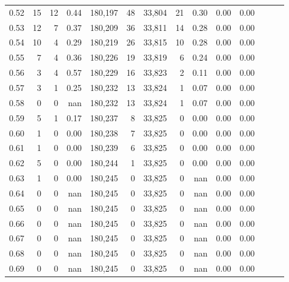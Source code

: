 \begin{tabular}{rrrrrrrrrrrrrr}
0.52 &      15 &     12 &  0.44 &  180,197 &       48 &  33,804 &      21 &  0.30 &  0.00 &      0.00 \\
0.53 &      12 &      7 &  0.37 &  180,209 &       36 &  33,811 &      14 &  0.28 &  0.00 &      0.00 \\
0.54 &      10 &      4 &  0.29 &  180,219 &       26 &  33,815 &      10 &  0.28 &  0.00 &      0.00 \\
0.55 &       7 &      4 &  0.36 &  180,226 &       19 &  33,819 &       6 &  0.24 &  0.00 &      0.00 \\
0.56 &       3 &      4 &  0.57 &  180,229 &       16 &  33,823 &       2 &  0.11 &  0.00 &      0.00 \\
0.57 &       3 &      1 &  0.25 &  180,232 &       13 &  33,824 &       1 &  0.07 &  0.00 &      0.00 \\
0.58 &       0 &      0 &   nan &  180,232 &       13 &  33,824 &       1 &  0.07 &  0.00 &      0.00 \\
0.59 &       5 &      1 &  0.17 &  180,237 &        8 &  33,825 &       0 &  0.00 &  0.00 &      0.00 \\
0.60 &       1 &      0 &  0.00 &  180,238 &        7 &  33,825 &       0 &  0.00 &  0.00 &      0.00 \\
0.61 &       1 &      0 &  0.00 &  180,239 &        6 &  33,825 &       0 &  0.00 &  0.00 &      0.00 \\
0.62 &       5 &      0 &  0.00 &  180,244 &        1 &  33,825 &       0 &  0.00 &  0.00 &      0.00 \\
0.63 &       1 &      0 &  0.00 &  180,245 &        0 &  33,825 &       0 &   nan &  0.00 &      0.00 \\
0.64 &       0 &      0 &   nan &  180,245 &        0 &  33,825 &       0 &   nan &  0.00 &      0.00 \\
0.65 &       0 &      0 &   nan &  180,245 &        0 &  33,825 &       0 &   nan &  0.00 &      0.00 \\
0.66 &       0 &      0 &   nan &  180,245 &        0 &  33,825 &       0 &   nan &  0.00 &      0.00 \\
0.67 &       0 &      0 &   nan &  180,245 &        0 &  33,825 &       0 &   nan &  0.00 &      0.00 \\
0.68 &       0 &      0 &   nan &  180,245 &        0 &  33,825 &       0 &   nan &  0.00 &      0.00 \\
0.69 &       0 &      0 &   nan &  180,245 &        0 &  33,825 &       0 &   nan &  0.00 &      0.00 \\

\end{tabular}

